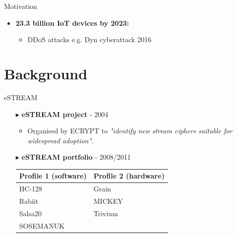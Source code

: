 \documentclass[10pt, compress]{beamer}
\begin{document}
\begin{frame}{Motivation}
\begin{itemize}[itemsep=0.5cm]
\item \textbf{23.3 billion IoT devices by 2023:}
\begin{itemize}
\item DDoS attacks e.g. Dyn cyberattack 2016
\end{itemize}
\end{itemize}
\end{frame}

\section{Background}

\begin{frame}{eSTREAM}
\begin{itemize}[itemsep=0.5cm]
\item[$\blacktriangleright$] \textbf{eSTREAM project} - 2004
\begin{itemize}
\item Organised by ECRYPT to \textit{"identify new stream ciphers suitable for widespread adoption"}.
\end{itemize}
\item[$\blacktriangleright$] \textbf{eSTREAM portfolio} - 2008/2011
\begin{table}
\centering
\begin{tabular}{l|l}
Profile 1 (software) & Profile 2 (hardware)\\\hline
HC-128 & Grain\\
Rabiit & MICKEY\\
Salsa20 & Trivium\\
SOSEMANUK & 
\end{tabular}
\end{table}
\end{itemize} 
\end{frame}
\end{document}
